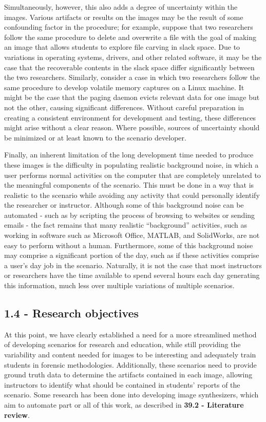 Simultaneously, however, this also adds a degree of uncertainty within
the images. Various artifacts or results on the images may be the result
of some confounding factor in the procedure; for example, suppose that
two researchers follow the same procedure to delete and overwrite a file
with the goal of making an image that allows students to explore file
carving in slack space. Due to variations in operating systems, drivers,
and other related software, it may be the case that the recoverable
contents in the slack space differ significantly between the two
researchers. Similarly, consider a case in which two researchers follow
the same procedure to develop volatile memory captures on a Linux
machine. It might be the case that the paging daemon evicts relevant
data for one image but not the other, causing significant differences.
Without careful preparation in creating a consistent environment for
development and testing, these differences might arise without a clear
reason. Where possible, sources of uncertainty should be minimized or at
least known to the scenario developer.

Finally, an inherent limitation of the long development time needed to
produce these images is the difficulty in populating realistic
background noise, in which a user performs normal activities on the
computer that are completely unrelated to the meaningful components of
the scenario. This must be done in a way that is realistic to the
scenario while avoiding any activity that could personally identify the
researcher or instructor. Although some of this background noise can be
automated - such as by scripting the process of browsing to websites or
sending emails - the fact remains that many realistic ``background''
activities, such as working in software such as Microsoft Office,
MATLAB, and SolidWorks, are not easy to perform without a human.
Furthermore, some of this background noise may comprise a significant
portion of the day, such as if these activities comprise a user's day
job in the scenario. Naturally, it is not the case that most instructors
or researchers have the time available to spend several hours each day
generating this information, much less over multiple variations of
multiple scenarios.

\subsection{1.4 - Research objectives}\label{research-objectives}

At this point, we have clearly established a need for a more streamlined
method of developing scenarios for research and education, while still
providing the variability and content needed for images to be
interesting and adequately train students in forensic methodologies.
Additionally, these scenarios need to provide ground truth data to
determine the artifacts contained in each image, allowing instructors to
identify what should be contained in students' reports of the scenario.
Some research has been done into developing image synthesizers, which
aim to automate part or all of this work, as described in \textbf{39.2 -
Literature review}.

